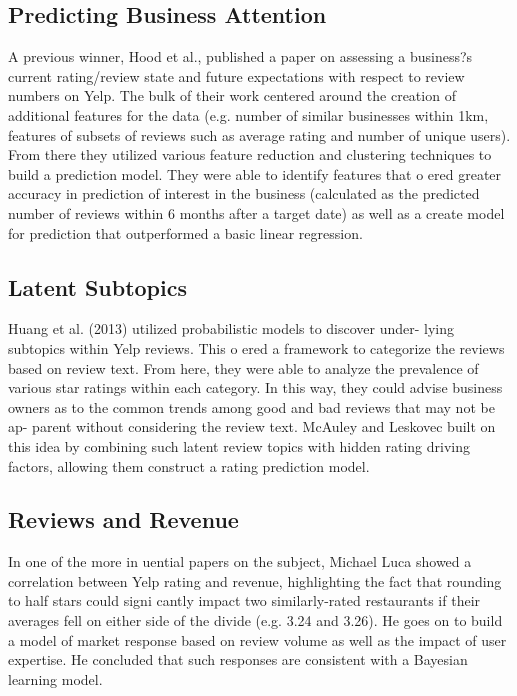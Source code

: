 \subsection{Predicting Business Attention}

A previous winner, Hood et al., published a paper on assessing a business?s current rating/review state and future expectations with respect to review numbers on Yelp. The bulk of their work centered around the creation of additional features for the data (e.g. number of similar businesses within 1km, features of subsets of reviews such as average rating and number of unique users). From there they utilized various feature reduction and clustering techniques to build a prediction model. They were able to identify features that o ered greater accuracy in prediction of interest in the business (calculated as the predicted number of reviews within 6 months after a target date) as well as a create model for prediction that outperformed a basic linear regression.

\subsection{Latent Subtopics}

Huang et al. (2013) utilized probabilistic models to discover under- lying subtopics within Yelp reviews. This o ered a framework to categorize the reviews based on review text. From here, they were able to analyze the prevalence of various star ratings within each category. In this way, they could advise business owners as to the common trends among good and bad reviews that may not be ap- parent without considering the review text. McAuley and Leskovec built on this idea by combining such latent review topics with hidden rating driving factors, allowing them construct a rating prediction model.

\subsection{Reviews and Revenue}

In one of the more in uential papers on the subject, Michael Luca showed a correlation between Yelp rating and revenue, highlighting the fact that rounding to half stars could signi cantly impact two similarly-rated restaurants if their averages fell on either side of the divide (e.g. 3.24 and 3.26). He goes on to build a model of market response based on review volume as well as the impact of user expertise. He concluded that such responses are consistent with a Bayesian learning model.

